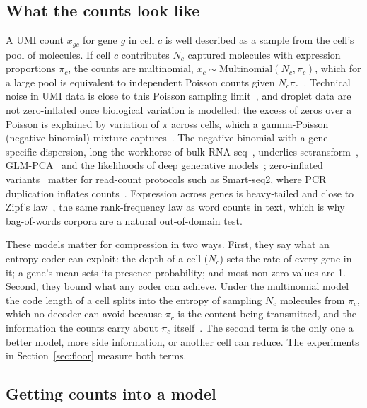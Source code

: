 \subsection{What the counts look like}

A UMI count $x_{gc}$ for gene $g$ in cell $c$ is well described as a sample from the cell's pool of molecules. If cell
$c$ contributes $N_c$ captured molecules with expression proportions $\pi_c$, the counts are multinomial,
$x_c \sim \mathrm{Multinomial}(N_c, \pi_c)$, which for a large pool is equivalent to independent Poisson counts given
$N_c\pi_c$~\cite{townes2019feature}. Technical noise in UMI data is close to this Poisson sampling
limit~\cite{grun2014validation,kim2020demystifying}, and droplet data are not zero-inflated once biological
variation is modelled: the excess of zeros over a Poisson is explained by variation of $\pi$ across cells, which a
gamma-Poisson (negative binomial) mixture captures~\cite{svensson2020droplet,choudhary2022comparison}. The negative
binomial with a gene-specific dispersion, long the workhorse of bulk RNA-seq~\cite{robinson2010edger,love2014moderated},
underlies sctransform~\cite{hafemeister2019normalization}, GLM-PCA~\cite{townes2019feature} and the likelihoods of deep
generative models~\cite{lopez2018deep,eraslan2019single}; zero-inflated variants~\cite{risso2018general} matter for
read-count protocols such as Smart-seq2, where PCR duplication inflates counts~\cite{sarkar2021separating}.
Expression across genes is heavy-tailed and close to Zipf's law~\cite{furusawa2003zipf}, the same rank-frequency
law as word counts in text, which is why bag-of-words corpora are a natural out-of-domain test.

These models matter for compression in two ways. First, they say what an entropy coder can exploit: the depth of a cell
($N_c$) sets the rate of every gene in it; a gene's mean sets its presence probability; and most non-zero values are 1.
Second, they bound what any coder can achieve. Under the multinomial model the code length of a cell splits into
the entropy of sampling $N_c$ molecules from $\pi_c$, which no decoder can avoid because $\pi_c$ is the content being
transmitted, and the information the counts carry about $\pi_c$ itself~\cite{cover2006elements}. The second term is the
only one a better model, more side information, or another cell can reduce. The experiments in
Section~\ref{sec:floor} measure both terms.

\subsection{Getting counts into a model}

